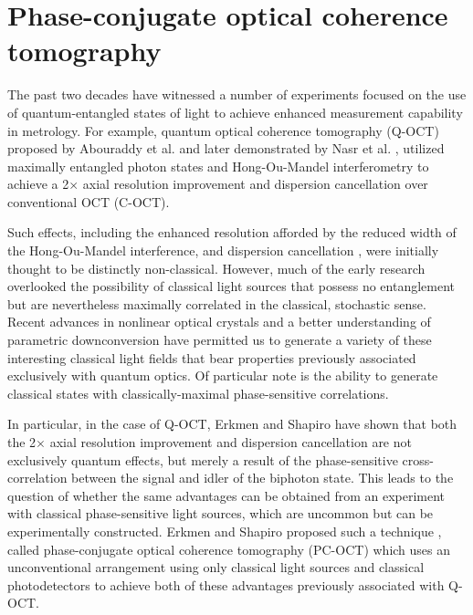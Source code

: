 \chapter{Phase-conjugate optical coherence tomography}

The past two decades have witnessed a number of experiments focused on the use of quantum-entangled states of light to achieve enhanced measurement capability in metrology. For example, quantum optical coherence tomography (Q-OCT) proposed by Abouraddy et al. \cite{abouraddy-qoct} and later demonstrated by Nasr et al. \cite{nasr-qoct}, utilized maximally entangled photon states and Hong-Ou-Mandel interferometry \cite{hong-interference} to achieve a 2$\times$ axial resolution improvement and dispersion cancellation over conventional OCT (C-OCT).

Such effects, including the enhanced resolution afforded by the reduced width of the Hong-Ou-Mandel interference, and dispersion cancellation \cite{steinberg-dispersion,franson-dispersion}, were initially thought to be distinctly non-classical. However, much of the early research overlooked the possibility of classical light sources that possess no entanglement but are nevertheless maximally correlated in the classical, stochastic sense. Recent advances in nonlinear optical crystals and a better understanding of parametric downconversion have permitted us to generate a variety of these interesting classical light fields that bear properties previously associated exclusively with quantum optics. Of particular note is the ability to generate classical states with classically-maximal phase-sensitive correlations.

In particular, in the case of Q-OCT, Erkmen and Shapiro \cite{erkmen-pcoct} have shown that both the 2$\times$ axial resolution improvement and dispersion cancellation are not exclusively quantum effects, but merely a result of the phase-sensitive cross-correlation between the signal and idler of the biphoton state. This leads to the question of whether the same advantages can be obtained from an experiment with classical phase-sensitive light sources, which are uncommon but can be experimentally constructed. Erkmen and Shapiro proposed such a technique \cite{erkmen-pcoct}, called phase-conjugate optical coherence tomography (PC-OCT) which uses an unconventional arrangement using only classical light sources and classical photodetectors to achieve both of these advantages previously associated with Q-OCT.

